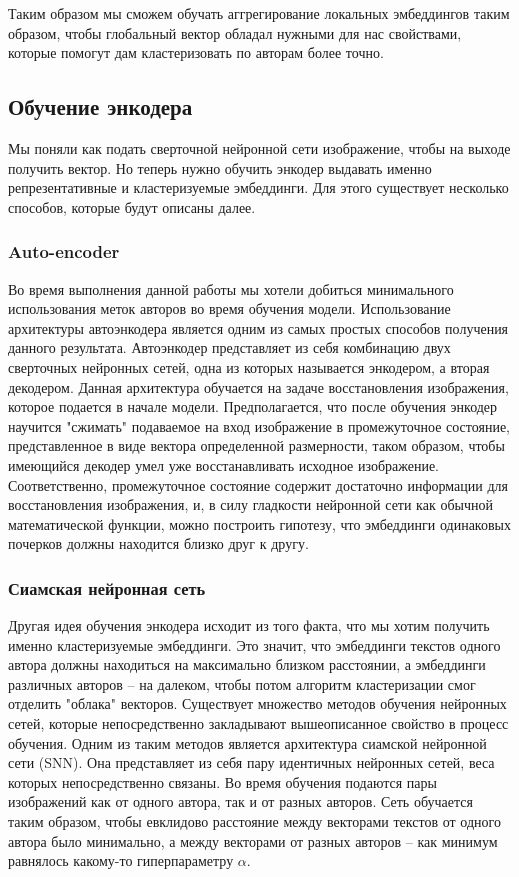     Таким образом мы сможем обучать аггрегирование локальных эмбеддингов таким образом, чтобы глобальный вектор обладал нужными для нас свойствами, которые помогут дам кластеризовать по авторам более точно. 

\subsection{Обучение энкодера}

    Мы поняли как подать сверточной нейронной сети изображение, чтобы на выходе получить вектор. Но теперь нужно обучить энкодер выдавать именно репрезентативные и кластеризуемые эмбеддинги. Для этого существует несколько способов, которые будут описаны далее.

\subsubsection{Auto-encoder}

    Во время выполнения данной работы мы хотели добиться минимального использования меток авторов во время обучения модели. Использование архитектуры автоэнкодера является одним из самых простых способов получения данного результата. Автоэнкодер представляет из себя комбинацию двух сверточных нейронных сетей, одна из которых называется энкодером, а вторая декодером. Данная архитектура обучается на задаче восстановления изображения, которое подается в начале модели. Предполагается, что после обучения энкодер научится "сжимать" подаваемое на вход изображение в промежуточное состояние, представленное в виде вектора определенной размерности, таком образом, чтобы имеющийся декодер умел уже восстанавливать исходное изображение. Соответственно, промежуточное состояние содержит достаточно информации для восстановления изображения, и, в силу гладкости нейронной сети как обычной математической функции, можно построить гипотезу, что эмбеддинги одинаковых почерков должны находится близко друг к другу. 

\subsubsection{Сиамская нейронная сеть}

    Другая идея обучения энкодера исходит из того факта, что мы хотим получить именно кластеризуемые эмбеддинги. Это значит, что эмбеддинги текстов одного автора должны находиться на максимально близком расстоянии, а эмбеддинги различных авторов -- на далеком, чтобы потом алгоритм кластеризации смог отделить "облака" векторов. Существует множество методов обучения нейронных сетей, которые непосредственно закладывают вышеописанное свойство в процесс обучения. Одним из таким методов является архитектура сиамской нейронной сети (SNN). Она представляет из себя пару идентичных нейронных сетей, веса которых непосредственно связаны. Во время обучения подаются пары изображений как от одного автора, так и от разных авторов. Сеть обучается таким образом, чтобы евклидово расстояние между векторами текстов от одного автора было минимально, а между векторами от разных авторов -- как минимум равнялось какому-то гиперпараметру $\alpha$. 

